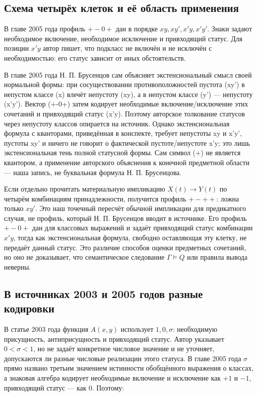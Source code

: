\documentclass[12pt,a4paper]{article}
\begin{document}
\subsection{Схема четырёх клеток и её область применения}

В главе 2005 года профиль \(+-0+\) дан в порядке \(xy,xy',x'y,x'y'\). Знаки задают необходимое включение, необходимое исключение и привходящий статус. Для позиции \(x'y\) автор пишет, что подкласс не включён и не исключён с необходимостью: его статус зависит от иных обстоятельств.

В главе 2005 года Н. П. Брусенцов сам объясняет экстенсиональный смысл своей нормальной формы: при сосуществовании противоположностей пустота (xy') в непустом классе (x) влечёт непустоту (xy), а в непустом классе (y') — непустоту (x'y'). Вектор (+-0+) затем кодирует необходимые включение/исключение этих сочетаний и привходящий статус (x'y). Поэтому авторское толкование статусов через непустоту классов опирается на источник. Однако экстенсиональная формула с кванторами, приведённая в конспекте, требует непустоты xy и x'y', пустоты xy' и ничего не говорит о фактической пустоте/непустоте x'y; это лишь экстенсиональная тень полной статусной формы. Сам символ (+) не является квантором, а применение авторского объяснения к конечной предметной области — наша запись, не буквальная формула Н. П. Брусенцова.

Если отдельно прочитать материальную импликацию \(X(t)\to Y(t)\) по четырём комбинациям принадлежности, получится профиль \(+-++\): ложна только \(xy'\). Это наш точечный пересчёт обычной импликации для предикатного случая, не профиль, который Н. П. Брусенцов вводит в источнике. Его профиль \(+-0+\) дан для классовых выражений и задаёт привходящий статус комбинации \(x'y\), тогда как экстенсиональная формула, свободно оставляющая эту клетку, не передаёт данный статус. Это различие способов оценки предметных сочетаний, но оно не доказывает, что семантическое следование \(\Gamma\models Q\) или правила вывода неверны.

\subsection{В источниках 2003 и 2005 годов разные кодировки}

В статье 2003 года функция \(A(x,y)\) использует \(1,0,\sigma\): необходимую присущность, антиприсущность и привходящий статус. Автор указывает \(0<\sigma<1\), но не задаёт конкретное числовое значение и не уточняет, допускаются ли разные числовые реализации этого статуса. В главе 2005 года \(\sigma\) прямо названо третьим значением истинности обобщённого выражения о классах, а знаковая алгебра кодирует необходимые включение и исключение как \(+1\) и \(-1\), привходящий статус — как \(0\). Поэтому:
\end{document}
